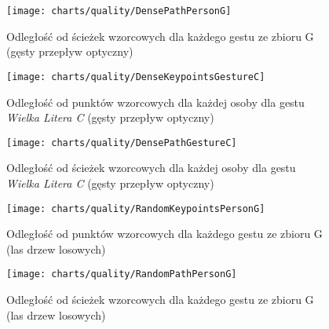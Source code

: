       \begin{figure}[!ht]
        \centering
        \texttt{[image: charts/quality/DensePathPersonG]}
        \caption[Odległość od ścieżek wzorcowych dla każdego gestu (gęsty przepływ optyczny)]
                {Odległość od ścieżek wzorcowych dla każdego gestu ze zbioru G\\(gęsty przepływ optyczny)}
        \label{fig:DensePathPersonG}
      \end{figure}

    \newpage
      \begin{figure}[!ht]
        \centering
        \texttt{[image: charts/quality/DenseKeypointsGestureC]}
        \caption[Odległość od punktów wzorcowych dla każdej osoby dla gestu C (gęsty przepływ optyczny)]
                {Odległość od punktów wzorcowych dla każdej osoby dla gestu\\\textit{Wielka Litera C} (gęsty przepływ optyczny)}
        \label{fig:DenseKeypointsGestureC}
      \end{figure}

      \begin{figure}[!ht]
        \centering
        \texttt{[image: charts/quality/DensePathGestureC]}
        \caption[Odległość od ścieżek wzorcowych dla każdej osoby dla gestu C (gęsty przepływ optyczny)]
                {Odległość od ścieżek wzorcowych dla każdej osoby dla gestu\\\textit{Wielka Litera C} (gęsty przepływ optyczny)}
        \label{fig:DensePathGestureC}
      \end{figure}

    \newpage
      \begin{figure}[!ht]
        \centering
        \texttt{[image: charts/quality/RandomKeypointsPersonG]}
        \caption[Odległość od punktów wzorcowych dla każdego gestu (las drzew losowych)]
                {Odległość od punktów wzorcowych dla każdego gestu ze zbioru G\\(las drzew losowych)}
        \label{fig:RandomKeypointsPersonG}
      \end{figure}

      \begin{figure}[!ht]
        \centering
        \texttt{[image: charts/quality/RandomPathPersonG]}
        \caption[Odległość od ścieżek wzorcowych dla każdego gestu (las drzew losowych)]
                {Odległość od ścieżek wzorcowych dla każdego gestu ze zbioru G\\(las drzew losowych)}
        \label{fig:RandomPathPersonG}
      \end{figure}

